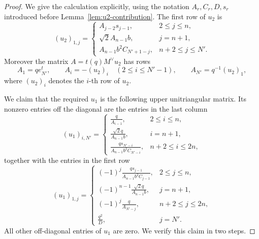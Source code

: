 \documentclass{article}
\begin{document}
\begin{proof}
We give the calculation explicitly, using the notation \(A_r,C_r,D,s_r\) introduced before Lemma~\ref{lem:u2-contribution}.
The first row of \(u_2\) is
\[
(u_2)_{1,j}=
\begin{cases}
A_{j-2}s_{j-1}, & 2\le j\le n,\\[0.4em]
\sqrt2A_{n-1}b, & j=n+1,\\[0.4em]
A_{n-1}b^2C_{N'+1-j}, & n+2\le j\le N'.
\end{cases}
\]
Moreover the matrix \(A=t(q)M^\vee u_2\) has rows
\[
A_1=q e_{N'}^t,
\qquad
A_i=-(u_2)_i\quad(2\le i\le N'-1),
\qquad
A_{N'}=q^{-1}(u_2)_1,
\]
where \((u_2)_i\) denotes the \(i\)-th row of \(u_2\).

We claim that the required \(u_1\) is the following upper unitriangular matrix. Its nonzero entries off the diagonal are the entries in the last column
\[
(u_1)_{i,N'}=
\begin{cases}
\displaystyle \frac{q}{A_{i-1}}, & 2\le i\le n,\\[1.1em]
\displaystyle \frac{\sqrt2q}{A_{n-1}b}, & i=n+1,\\[1.1em]
\displaystyle \frac{q s_{N'-i}}{A_{n-1}b^2C_{N'-i}}, & n+2\le i\le 2n,
\end{cases}
\]
together with the entries in the first row
\[
(u_1)_{1,j}=
\begin{cases}
\displaystyle (-1)^j\frac{q s_{j-1}}{A_{n-1}b^2C_{j-1}}, & 2\le j\le n,\\[1.1em]
\displaystyle (-1)^{n-1}\frac{\sqrt2q}{A_{n-1}b}, & j=n+1,\\[1.1em]
\displaystyle (-1)^j\frac{q}{A_{N'-j}}, & n+2\le j\le 2n,\\[1.1em]
\displaystyle \frac{q^2}{D}, & j=N'.
\end{cases}
\]
All other off-diagonal entries of \(u_1\) are zero. We verify this claim in two steps.


\end{proof}
\end{document}

